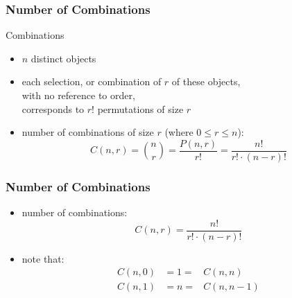 \documentclass[dvipsnames]{beamer}
\begin{document}
\begin{frame}
  \frametitle{Number of Combinations}

  \begin{block}{Combinations}
    \begin{itemize}
      \item $n$ distinct objects
      \item each selection, or \alert{combination} of $r$ of these objects,\\
        with no reference to order,\\
        corresponds to $r!$ permutations of size $r$

      \pause
      \medskip
      \item number of combinations of size $r$ (where $0 \leq r \leq n$):
      \begin{equation*}
        C(n,r) = {n \choose r} = \frac{P(n,r)}{r!} = \frac{n!}{r! \cdot (n-r)!}
      \end{equation*}
    \end{itemize}
  \end{block}
\end{frame}

\begin{frame}
  \frametitle{Number of Combinations}

  \begin{itemize}
    \item number of combinations:
    \begin{equation*}
      C(n,r) = \frac{n!}{r! \cdot (n-r)!}
    \end{equation*}

    \item note that:
    \begin{eqnarray*}
      C(n,0) & = 1 = & C(n,n)\\
      C(n,1) & = n = & C(n,n-1)
    \end{eqnarray*}
  \end{itemize}
\end{frame}
\end{document}
